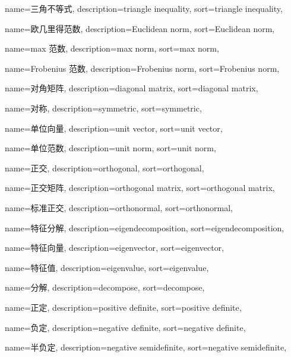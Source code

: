 {
  name=三角不等式,
  description={triangle inequality},
  sort={triangle inequality},
}

{
  name=欧几里得范数,
  description={Euclidean norm},
  sort={Euclidean norm},
}

{
  name=max 范数,
  description={max norm},
  sort={max norm},
}

{
  name=Frobenius 范数,
  description={Frobenius norm},
  sort={Frobenius norm},
}

{
  name=对角矩阵,
  description={diagonal matrix},
  sort={diagonal matrix},
}

{
  name=对称,
  description={symmetric},
  sort={symmetric},
}

{
  name=单位向量,
  description={unit vector},
  sort={unit vector},
}

{
  name=单位范数,
  description={unit norm},
  sort={unit norm},
}

{
  name=正交,
  description={orthogonal},
  sort={orthogonal},
}

{
  name=正交矩阵,
  description={orthogonal matrix},
  sort={orthogonal matrix},
}

{
  name=标准正交,
  description={orthonormal},
  sort={orthonormal},
}

{
  name=特征分解,
  description={eigendecomposition},
  sort={eigendecomposition},
}

{
  name=特征向量,
  description={eigenvector},
  sort={eigenvector},
}

{
  name=特征值,
  description={eigenvalue},
  sort={eigenvalue},
}

{
  name=分解,
  description={decompose},
  sort={decompose},
}

{
  name=正定,
  description={positive definite},
  sort={positive definite},
}

{
  name=负定,
  description={negative definite},
  sort={negative definite},
}

{
  name=半负定,
  description={negative semidefinite},
  sort={negative semidefinite},
}

